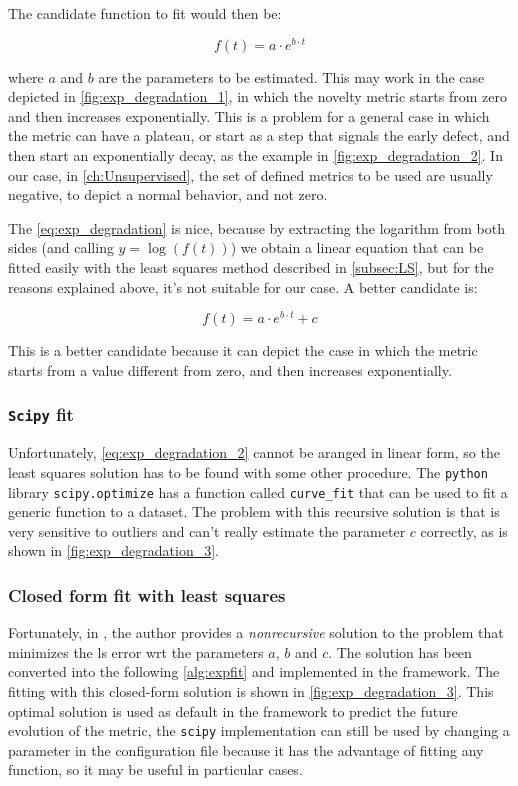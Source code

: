 The candidate function to fit would then be:

\begin{equation}
    \label{eq:exp_degradation}
    f(t) = a \cdot e^{b \cdot t}
\end{equation}

where $a$ and $b$ are the parameters to be estimated. This may work in the case depicted in \autoref{fig:exp_degradation_1}, in which the novelty metric starts from zero and then increases exponentially. This is a problem for a general case in which the metric can have a plateau, or start as a step that signals the early defect, and then start an exponentially decay, as the example in \autoref{fig:exp_degradation_2}. In our case, in \autoref{ch:Unsupervised}, the set of defined metrics to be used are usually negative, to depict a normal behavior, and not zero. 

The \autoref{eq:exp_degradation} is nice, because by extracting the logarithm from both sides (and calling $y = \log(f(t))$) we obtain a linear equation that can be fitted easily with the least squares method described in \autoref{subsec:LS}, but for the reasons explained above, it's not suitable for our case. A better candidate is:

\begin{equation}
    \label{eq:exp_degradation_2}
    f(t) = a \cdot e^{b \cdot t} + c
\end{equation}

This is a better candidate because it can depict the case in which the metric starts from a value different from zero, and then increases exponentially.

\subsubsection{\texttt{Scipy} fit}
Unfortunately, \autoref{eq:exp_degradation_2} cannot be aranged in linear form, so the least squares solution has to be found with some other procedure. The \texttt{python} library \texttt{scipy.optimize} has a function called \texttt{curve\_fit} that can be used to fit a generic function to a dataset. The problem with this recursive solution is that is very sensitive to outliers and can't really estimate the parameter $c$ correctly, as is shown in \autoref{fig:exp_degradation_3}.

\subsubsection{Closed form fit with least squares}
Fortunately, in \cite{Exp_fit}, the author provides a \emph{nonrecursive} solution to the problem that minimizes the \gls{ls} error \gls{wrt} the parameters $a$, $b$ and $c$. The solution has been converted into the following \autoref{alg:expfit} and implemented in the framework. The fitting with this closed-form solution is shown in \autoref{fig:exp_degradation_3}. This optimal solution is used as default in the framework to predict the future evolution of the metric, the \texttt{scipy} implementation can still be used by changing a parameter in the configuration file because it has the advantage of fitting any function, so it may be useful in particular cases.

